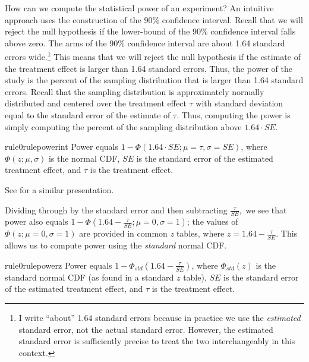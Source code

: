 \documentclass[12pt]{article}
\begin{document}
How can we compute the statistical power of an experiment? 
An intuitive approach uses the construction of the 90\% confidence interval. 
Recall that we will reject the null hypothesis if the lower-bound of the 90\% confidence interval falls above zero. 
The arms of the 90\% confidence interval are about 1.64 standard errors wide.\footnote{
  I write ``about'' 1.64 standard errors because in practice we use the \emph{estimated} standard error, not the actual standard error. 
  However, the estimated standard error is sufficiently precise to treat
  the two interchangeably in this context.
  }
This means that we will reject the null hypothesis if the estimate of the treatment effect is larger than 1.64 standard errors. 
Thus, the power of the study is the percent of the sampling distribution that is larger than 1.64 standard errors. 
Recall that the sampling distribution is approximately normally distributed and centered over the treatment effect $\tau$ with standard deviation equal to the standard error of the estimate of $\tau$. 
Thus, computing the power is simply computing the percent of the sampling distribution above $1.64 \cdot SE$.



\begin{restatable}{rule0}{rulepowerint}
\label{rule:power-int}
Power equals $1 - \Phi(1.64 \cdot SE;\mu = \tau,\sigma = SE)$, where $\Phi(z;\mu,\sigma)$ is the normal CDF, $SE$ is the standard error of the estimated treatment effect, and $\tau$ is the treatment effect.
\end{restatable}

\noindent See \citet[92]{Gerber2012} for a similar presentation.

Dividing through by the standard error and then subtracting $\frac{\tau}{SE},$ we see that power also equals $1 - \Phi\left( 1.64 - \frac{\tau}{SE};\mu = 0,\sigma = 1 \right)$; the values of $\Phi\left(z;\mu = 0,\sigma = 1 \right)$ are provided in common \emph{z} tables, where $z = 1.64 - \frac{\tau}{SE}$. 
This allows us to compute power using the \emph{standard} normal CDF.

\begin{restatable}{rule0}{rulepowerz}
\label{rule:power-z}
Power equals $1 - \Phi_{std}\left( 1.64 - \frac{\tau}{SE} \right)$, where $\Phi_{std}(z)$ is the standard normal CDF (as found in a standard $z$ table), $SE$ is the standard error of the estimated treatment effect, and $\tau$ is the treatment effect.
\end{restatable}
\end{document}
